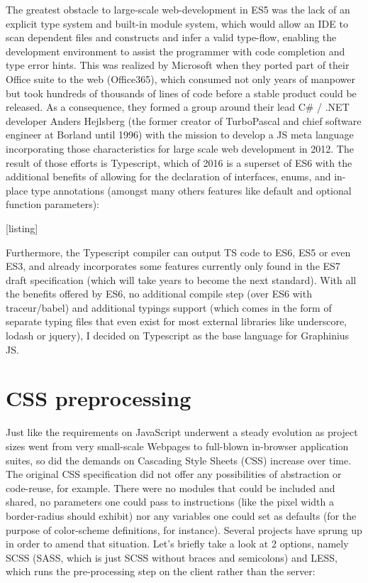	The greatest obstacle to large-scale web-development in ES5 was the lack of an explicit type system and built-in module system, which would allow an IDE to scan dependent files and constructs and infer a valid type-flow, enabling the development environment to assist the programmer with code completion and type error hints. This was realized by Microsoft when they ported part of their Office suite to the web (Office365), which consumed not only years of manpower but took hundreds of thousands of lines of code before a stable product could be released. As a consequence, they formed a group around their lead C\# / .NET developer Anders Hejlsberg (the former creator of TurboPascal and chief software engineer at Borland until 1996) with the mission to develop a JS meta language incorporating those characteristics for large scale web development in 2012. The result of those efforts is Typescript, which of 2016 is a superset of ES6 with the additional benefits of allowing for the declaration of interfaces, enums, and in-place type annotations (amongst many others features like default and optional function parameters): 
	
	[listing]
	
	Furthermore, the Typescript compiler can output TS code to ES6, ES5 or even ES3, and already incorporates some features currently only found in the ES7 draft specification (which will take years to become the next standard). With all the benefits offered by ES6, no additional compile step (over ES6 with traceur/babel) and additional typings support (which comes in the form of separate typing files that even exist for most external libraries like underscore, lodash or jquery), I decided on Typescript as the base language for Graphinius JS.
	

\section{CSS preprocessing}
\label{sect:css_preproc}

	Just like the requirements on JavaScript underwent a steady evolution as project sizes went from very small-scale Webpages to full-blown in-browser application suites, so did the demands on Cascading Style Sheets (CSS) increase over time. The original CSS specification did not offer any possibilities of abstraction or code-reuse, for example. There were no modules that could be included and shared, no parameters one could pass to instructions (like the pixel width a border-radius should exhibit) nor any variables one could set as defaults (for the purpose of color-scheme definitions, for instance). Several projects have sprung up in order to amend that situation. Let's briefly take a look at 2 options, namely SCSS (SASS, which is just SCSS without braces and semicolons) and LESS, which runs the pre-processing step on the client rather than the server:
	
